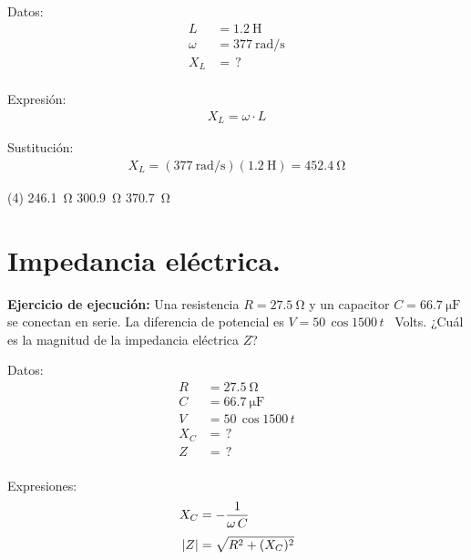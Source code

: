 \documentclass[12pt, letter]{exam}
\begin{document}
\begin{questions}
    \begin{minipage}[t]{0.35\linewidth}
    Datos: 
    \begin{align*}
    L &= \SI{1.2}{\henry} \\[0.3em]
    \omega &= \SI{377}{\radian\per\second} \\[0.3em]
    X_{L} &= \, ? \\
    \end{align*}
    \end{minipage}
    \hspace{1cm}
    \begin{minipage}[t]{0.4\linewidth}
    Expresión:
    \begin{align*}
    X_{L} = \omega \cdot L
    \end{align*}
    \end{minipage}
    
    Sustitución:
    \begin{align*}
    X_{L} = (\SI{377}{\radian\per\second})(\SI{1.2}{\henry}) = \SI{452.4}{\ohm}
    \end{align*}

    \vspace{0.3cm}
    \begin{tasks}(4)
        \task \SI{246.1}{\ohm}
        \task \SI{300.9}{\ohm}
        \task \SI{370.7}{\ohm}
        \task {}
    \end{tasks}

    \setcounter{section}{14} 
    \section{Impedancia eléctrica.}

    \setcounter{question}{32} \question \textbf{Ejercicio de ejecución: } Una resistencia $R = \SI{27.5}{\ohm}$ y un capacitor $C = \SI{66.7}{\micro\farad}$ se conectan en serie. La diferencia de potencial es $V = \num{50} \, \cos 1500 \, t$ \, Volts. ¿Cuál es la magnitud de la impedancia eléctrica $Z$?
    
    \begin{minipage}[t]{0.35\linewidth}
    Datos: 
    \begin{align*}
    R &= \SI{27.5}{\ohm} \\[0.3em]
    C &= \SI{66.7}{\micro\farad} \\[0.3em]
    V &= \num{50} \, \cos 1500 \, t \\[0.3em]
    X_{C} &= \, ? \\[0.3em]
    Z &= \, ? \\
    \end{align*}
    \end{minipage}
    \hspace{1cm}
    \begin{minipage}[t]{0.4\linewidth}
    Expresiones:
    \begin{align*}
    X_{C} &= - \dfrac{1}{\omega \, C} \\[0.3em]
    \abs{Z} &= \sqrt{R^{2} + (X_{C})^{2}}
    \end{align*}
    \end{minipage}
    

\end{questions}
\end{document}
